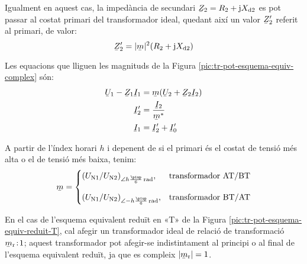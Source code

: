 \begin{center}
    
    \label{pic:tr-pot-esquema-equiv-complex}
\end{center}

Igualment en aquest cas, la impedància de secundari $\cmplx{Z}_2=R_2 + \ju X\ped{d2}$ es pot passar al costat primari del transformador ideal, quedant així un valor $\cmplx{Z}_2'$ referit al primari, de valor:
\begin{equation}
    \cmplx{Z}_2' = |\cmplx{m}|^2 (R_2 + \ju X\ped{d2})
\end{equation}

Les equacions que lliguen les magnituds de la Figura \vref{pic:tr-pot-esquema-equiv-complex} són:
\begin{subequations}
\begin{align}
    \cmplx{U}_1 - \cmplx{Z}_1 \cmplx{I}_1 &= \cmplx{m} ( \cmplx{U}_2  + \cmplx{Z}_2 \cmplx{I}_2 ) \\
    \cmplx{I}'_2 &= \frac{\cmplx{I}_2}{\cmplx{m}^*} \\
    \cmplx{I}_1  &=   \cmplx{I}_2' + \cmplx{I}_0'
\end{align}
\end{subequations}

A partir de l'índex horari $h$ i depenent de si el primari és el costat de tensió més alta o el de tensió més baixa, tenim:
\begin{equation}
\cmplx{m} = \begin{cases}
     (U\ped{N1}/U\ped{N2})_{\angle h \frac{\piup}{6}\unit{rad}}, & \text{transformador AT/BT}\\[2.7ex]
     (U\ped{N1}/U\ped{N2})_{\angle -h \frac{\piup}{6}\unit{rad}}, & \text{transformador BT/AT}
\end{cases}
\label{eq:rel-transf-cmplx}
\end{equation}

En el cas de l'esquema equivalent reduït en «T» de la Figura \vref{pic:tr-pot-esquema-equiv-reduit-T}, cal afegir un transformador ideal de relació de transformació  $\cmplx{m}\ped{r}\!:\!1$; aquest transformador pot afegir-se indistintament  al principi o al final de l'esquema equivalent reduït, ja que es compleix $|\cmplx{m}\ped{r}|=1$.

\begin{center}
    
    \label{fig:esq-reduit-T-complex}
\end{center}

